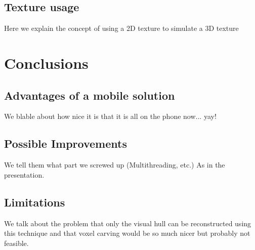 \documentclass[10pt,twocolumn,letterpaper]{article}
\begin{document}
\subsection{Texture usage}

Here we explain the concept of using a 2D texture to simulate a 3D texture

\section{Conclusions}

\subsection{Advantages of a mobile solution}

We blable about how nice it is that it is all on the phone now... yay!

\subsection{Possible Improvements}

We tell them what part we screwed up (Multithreading, etc.) As in the presentation.

\subsection{Limitations}

We talk about the problem that only the visual hull can be reconstructed using this technique and that voxel carving would be so much nicer but probably not feasible.


{\small


}
\end{document}
